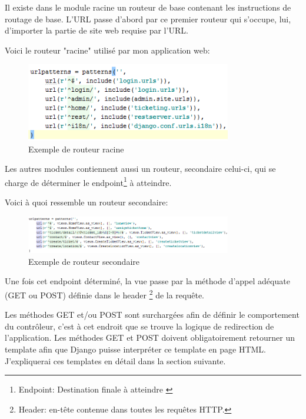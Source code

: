\documentclass[12pt,table,a4paper]{report}
\begin{document}
Il existe dans le module racine un routeur de base contenant les instructions de routage de base. L'URL passe d'abord par ce premier routeur qui s'occupe, lui, d'importer la partie de site web requise par l'URL.

Voici le routeur "racine" utilisé par mon application web:
\begin{figure}
	\centering
		\includegraphics[width=0.8\textwidth,natwidth=377,natheight=144]{images/ticket-routeur-racine.png}
	\caption{Exemple de routeur racine}
	\label{fig:ticket-routeur-racine}
\end{figure}

Les autres modules contiennent aussi un routeur, secondaire celui-ci, qui se charge de déterminer le endpoint\footnote{Endpoint: Destination finale à atteindre \label{endpointFootnote}} à atteindre.

Voici à quoi ressemble un routeur secondaire:
\begin{figure}
	\centering
		\includegraphics[width=0.8\textwidth,natwidth=737,natheight=136]{images/ticket-routeur-secondaire.png}
	\caption{Exemple de routeur secondaire}
	\label{fig:ticket-routeur-secondaire}
\end{figure}

Une fois cet endpoint déterminé, la vue passe par la méthode d'appel adéquate (GET ou POST) définie dans le header \footnote{Header: en-tête contenue dans toutes les requêtes HTTP.} de la requête.

Les méthodes GET et/ou POST sont surchargées afin de définir le comportement du contrôleur, c'est à cet endroit que se trouve la logique de redirection de l'application. Les méthodes GET et POST doivent obligatoirement retourner un template afin que Django puisse interpréter ce template en page HTML. J'expliquerai ces templates en détail dans la section suivante.
\end{document}
